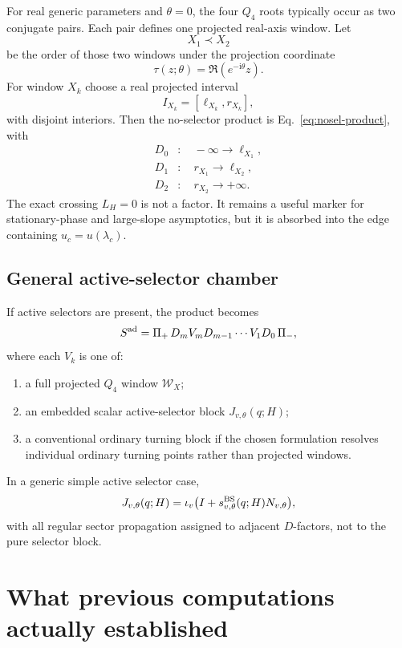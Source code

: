 \documentclass[11pt]{article}
\newcommand{\ii}{\mathrm i}
\newcommand{\calW}{\mathcal W}
\begin{document}
For real generic parameters and $\theta=0$, the four $Q_4$ roots typically occur as two conjugate pairs. Each pair defines one projected real-axis window. Let
\[
X_1\prec X_2
\]
be the order of those two windows under the projection coordinate
\begin{equation}
\tau(z;\theta)=\Re(e^{-\ii\theta}z).
\end{equation}
For window $X_k$ choose a real projected interval
\begin{equation}
 I_{X_k}=[\ell_{X_k},r_{X_k}],
\end{equation}
with disjoint interiors. Then the no-selector product is Eq.~\eqref{eq:nosel-product}, with
\begin{align}
D_0&:\quad -\infty\to \ell_{X_1},\\
D_1&:\quad r_{X_1}\to \ell_{X_2},\\
D_2&:\quad r_{X_2}\to +\infty.
\end{align}
The exact crossing $L_H=0$ is not a factor. It remains a useful marker for stationary-phase and large-slope asymptotics, but it is absorbed into the edge containing $u_c=u(\lambda_c)$.

\subsection{General active-selector chamber}

If active selectors are present, the product becomes
\begin{equation}
S^{\rm ad}=\Pi_+\,D_m V_mD_{m-1}\cdots V_1D_0\,\Pi_-,
\end{equation}
where each $V_k$ is one of:
\begin{enumerate}
  \item a full projected $Q_4$ window $\calW_X$;
  \item an embedded scalar active-selector block $J_{v,\theta}(q;H)$;
  \item a conventional ordinary turning block if the chosen formulation resolves individual ordinary turning points rather than projected windows.
\end{enumerate}
In a generic simple active selector case,
\begin{equation}
J_{v,\theta}(q;H)=\iota_v\bigl(I+s^{\rm BS}_{v,\theta}(q;H)N_{v,\theta}\bigr),
\end{equation}
with all regular sector propagation assigned to adjacent $D$-factors, not to the pure selector block.

\section{What previous computations actually established}
\end{document}
